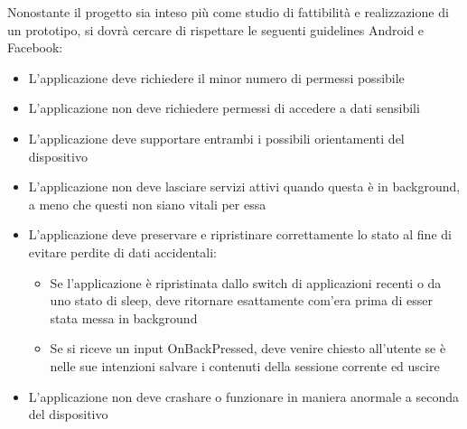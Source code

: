 Nonostante il progetto sia inteso più come studio di fattibilità e realizzazione di un prototipo, si dovrà cercare di rispettare le seguenti guidelines Android e Facebook:
\begin{itemize}
\item L'applicazione deve richiedere il minor numero di permessi possibile
\item L'applicazione non deve richiedere permessi di accedere a dati sensibili
\item L'applicazione deve supportare entrambi i possibili orientamenti del dispositivo
\item L'applicazione non deve lasciare servizi attivi quando questa è in background, a meno che questi non siano vitali per essa
\item L'applicazione deve preservare e ripristinare correttamente lo stato al fine di evitare perdite di dati accidentali:
\begin{itemize}
\item Se l'applicazione è ripristinata dallo switch di applicazioni recenti o da uno stato di sleep, deve ritornare esattamente com'era prima di esser stata messa in background
\item Se si riceve un input OnBackPressed, deve venire chiesto all'utente se è nelle sue intenzioni salvare i contenuti della sessione corrente ed uscire
\end{itemize}
\item L'applicazione non deve crashare o funzionare in maniera anormale a seconda del dispositivo
\end{itemize}



